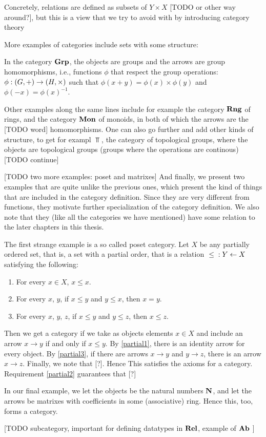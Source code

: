 \documentclass{article}
\begin{document}
Concretely, relations are defined as subsets of $Y \times X$ [TODO or other way around?], but this is a view that we try to avoid with by introducing category theory 

More examples of categories include sets with some structure:
\begin{Ex}
  In the category $\mathbf{Grp}$, the objects are groups and the arrows are group homomorphisms, i.e., functions $\phi$ that respect the group operations: $\phi : (G, +) \to (H, \times)$ such that $\phi(x + y) = \phi(x) \times \phi(y)$ and $\phi(-x) = \phi(x)^{-1}$.
\end{Ex}
\begin{Ex}
Other examples along the same lines include for example the category $\mathbf{Rng}$ of rings, and the category $\mathbf{Mon}$ of monoids, in both of which the arrows are the [TODO word] homomorphisms. One can also go further and add other kinds of structure, to get for exampl $\Top$, the category of topological groups, where the objects are topological groups (groups where the operations are continous) [TODO continue]
\end{Ex}
[TODO two more examples: poset and matrixes]
And finally, we present two examples that are quite unlike the previous ones, which present the kind of things that are included in the category definition. Since they are very different from functions, they motivate further specialization of the category definition. We also note that they (like all the categories we have mentioned) have some relation to the later chapters in this thesis.
\begin{Ex}
The first strange example is a so called poset category. Let $X$ be any partially ordered set, that is, a set with a partial order, that is a relation ${}\le{} : Y \leftarrow X$ satisfying the following: 
\begin{enumerate}
\item \label{partial1} For every $x \in X$, $x \le x$.
\item \label{partial2} For every $x$, $y$, if $x \le y$ and $y \le x$, then $x = y$.
\item \label{partial3} For every $x$, $y$, $z$, if $x \le y$ and $y \le z$, then $x \le z$.
\end{enumerate}
Then we get a category if we take as objects elements $x \in X$ and include an arrow $x \to y$ if and only if $x \le y$. By \ref{partial1}, there is an identity arrow for every object. By \ref{partial3}, if there are arrows $x \to y$ and $y \to z$, there is an arrow $x \to z$. Finally, we note that [?]. Hence This satisfies the axioms for a category. Requirement \ref{partial2} guarantees that [?]
\end{Ex}
\begin{Ex}
In our final example, we let the objects be the natural numbers $\mathbf{N}$, and let the arrows be matrixes with coefficients in some (associative) ring. Hence this, too, forms a category.
\end{Ex}
[TODO subcategory, important for defining datatypes in $\mathbf{Rel}$, example of $\mathbf{Ab}$ ]
\end{document}
